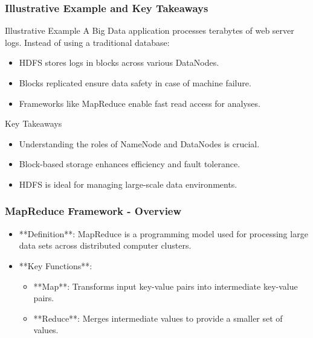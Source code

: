 \documentclass[aspectratio=169]{beamer}
\begin{document}
\begin{frame}[fragile]
    \frametitle{Illustrative Example and Key Takeaways}
    \begin{block}{Illustrative Example}
        A Big Data application processes terabytes of web server logs. Instead of using a traditional database:
        \begin{itemize}
            \item HDFS stores logs in blocks across various DataNodes.
            \item Blocks replicated ensure data safety in case of machine failure.
            \item Frameworks like MapReduce enable fast read access for analyses.
        \end{itemize}
    \end{block}
    \begin{block}{Key Takeaways}
        \begin{itemize}
            \item Understanding the roles of NameNode and DataNodes is crucial.
            \item Block-based storage enhances efficiency and fault tolerance.
            \item HDFS is ideal for managing large-scale data environments.
        \end{itemize}
    \end{block}
\end{frame}

\begin{frame}[fragile]
    \frametitle{MapReduce Framework - Overview}
    \begin{itemize}
        \item **Definition**: MapReduce is a programming model used for processing large data sets across distributed computer clusters.
        \item **Key Functions**:
        \begin{itemize}
            \item **Map**: Transforms input key-value pairs into intermediate key-value pairs.
            \item **Reduce**: Merges intermediate values to provide a smaller set of values.
        \end{itemize}
    \end{itemize}
\end{frame}
\end{document}
